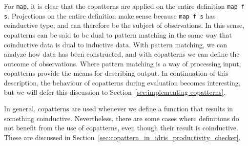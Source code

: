 For \texttt{map}, it is clear that the copatterns are applied on the entire definition \texttt{map f s}. Projections on the entire definition make sense because \texttt{map f s} has coinductive type, and can therefore be the subject of observations. In this sense, copatterns can be said to be dual to pattern matching in the same way that coinductive data is dual to inductive data. With pattern matching, we can analyze how data has been constructed, and with copatterns we can define the outcome of observations. Where pattern matching is a way of processing input, copatterns provide the means for describing output. In continuation of this description, the behaviour of copatterns during evaluation becomes interesting, but we will defer this discussion to Section~\ref{sec:implementing-copatterns}.

In general, copatterns are used whenever we define a function that results in something coinductive. Nevertheless, there are some cases where definitions do not benefit from the use of copatterns, even though their result is coinductive. These are discussed in Section~\ref{sec:copattern_in_idris_productivity_checker}.












